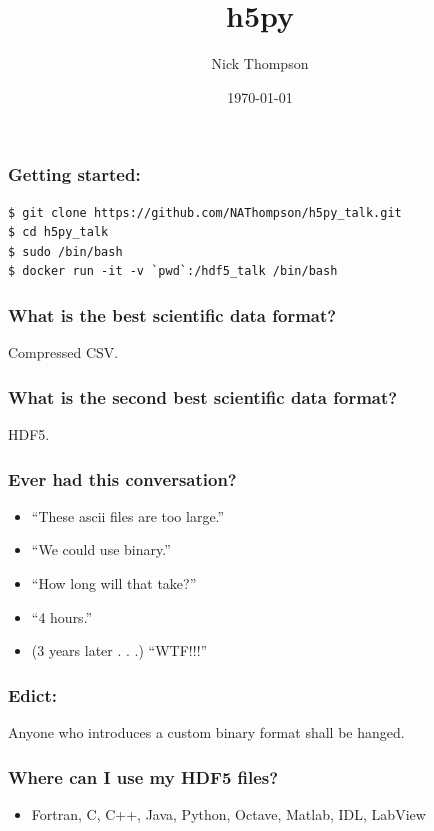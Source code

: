 \documentclass[9pt]{beamer}
\begin{document}
\title{h5py}
\author{Nick Thompson} 
\date{\today}

\frame{\titlepage}

\begin{frame}[fragile]
\frametitle{Getting started:}
\begin{verbatim}
$ git clone https://github.com/NAThompson/h5py_talk.git
$ cd h5py_talk
$ sudo /bin/bash
$ docker run -it -v `pwd`:/hdf5_talk /bin/bash
\end{verbatim}
\end{frame}

\begin{frame}[fragile]
  \frametitle{What is the best scientific data format?}
  \pause
  Compressed CSV.
\end{frame}


\begin{frame}[fragile]
  \frametitle{What is the second best scientific data format?}
  HDF5.
\end{frame}

\begin{frame}[fragile]
  \frametitle{Ever had this conversation?}
  \begin{itemize}
  \item ``These ascii files are too large.''
  \item ``We could use binary.''
  \item ``How long will that take?''
  \item ``4 hours.''
  \item (3 years later . . .) ``WTF!!!''
  \end{itemize}
\end{frame}

\begin{frame}[fragile]
  \frametitle{Edict:}

  Anyone who introduces a custom binary format shall be hanged.
\end{frame}

\begin{frame}[fragile]
  \frametitle{Where can I use my HDF5 files?}
  \begin{itemize}
  \item Fortran, C, C++, Java, Python, Octave, Matlab, IDL, LabView
  \end{itemize}
\end{frame}
\end{document}
